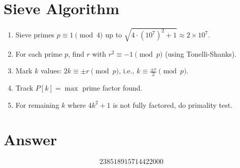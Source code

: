 \documentclass[12pt]{article}
\theoremstyle{definition}
\begin{document}
\section{Sieve Algorithm}

\begin{enumerate}
\item Sieve primes $p \equiv 1 \pmod{4}$ up to $\sqrt{4\cdot(10^7)^2+1} \approx 2\times 10^7$.
\item For each prime $p$, find $r$ with $r^2 \equiv -1 \pmod{p}$ (using Tonelli-Shanks).
\item Mark $k$ values: $2k \equiv \pm r \pmod{p}$, i.e., $k \equiv \frac{\pm r}{2} \pmod{p}$.
\item Track $P[k] = \max$ prime factor found.
\item For remaining $k$ where $4k^2+1$ is not fully factored, do primality test.
\end{enumerate}

\section{Answer}

\[
\boxed{238518915714422000}
\]
\end{document}
